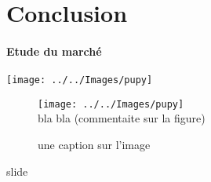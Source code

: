 \documentclass{article}
\begin{document}
\section*{Conclusion}

\paragraph{Etude du march\'e}
\begin{center}
	\texttt{[image: ../../Images/pupy]}
\end{center}
\begin{figure}[ht]
	\centering
	\texttt{[image: ../../Images/pupy]}\\
	bla bla (commentaite sur la figure)
	\caption{une caption sur l'image}
	\label{key}
	
\end{figure}
\begin{frame}
	slide
\end{frame}


\begin{center}
	\begin{minipage}{10cm}
		
	\end{minipage}
\end{center}
\end{document}
